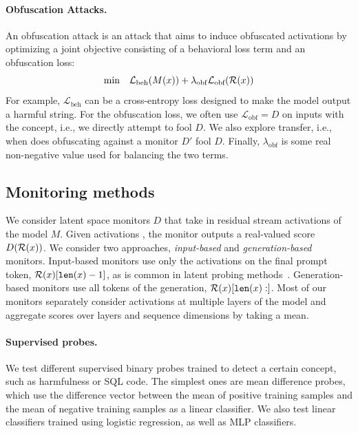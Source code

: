 \documentclass{article}
\begin{document}
\paragraph{Obfuscation Attacks.} An obfuscation attack is an attack that aims to induce obfuscated activations by optimizing a joint objective consisting of a behavioral loss term and an obfuscation loss:
\begin{equation} \label{eq:obfs_rep_attacks}
    \min \;\;\; \mathcal{L}_{\textrm{beh}}(M(x)) + \lambda_\mathrm{obf} \mathcal{L}_{\textrm{obf}}(\repr{x})
\end{equation}
For example, $\mathcal{L}_{\textrm{beh}}$ can be a cross-entropy loss designed to make the model output a harmful string. For the obfuscation loss, we often use 
$\mathcal{L}_{\textrm{obf}} = D$ on inputs with the concept, i.e., we directly attempt to fool $D$. 
We also explore transfer, i.e., when does obfuscating against a monitor $D'$ fool $D$.
Finally, 
$\lambda_\mathrm{obf}$ is some real non-negative value used 
for balancing the two terms.



\subsection{Monitoring methods}\label{sec:methods-defense}

We consider latent space monitors $D$ that take in residual 
stream activations of the model $M$. Given activations
, the monitor outputs a real-valued
score $D(\repr{x})$. We consider two approaches, \emph{input-based} and \emph{generation-based} monitors. Input-based monitors use only the activations on the final prompt token, $\repr{x}[\texttt{len}(x) - 1]$, as is common in latent probing methods~\citep{burns2022discovering,marks2024geometry, kirch2024features}. Generation-based monitors use all tokens of the generation, $\repr{x}[\texttt{len}(x) :]$.
Most of our monitors separately consider activations at multiple layers of the model and aggregate scores over layers and sequence dimensions by taking a mean.

\paragraph{Supervised probes.}
We test different supervised binary probes trained to detect a certain concept, such as harmfulness or SQL code. The simplest ones are mean difference probes, which use the difference vector between the mean of positive training samples and the mean of negative training samples as a linear classifier. We also test linear classifiers trained using logistic regression, as well as MLP classifiers.
\end{document}

